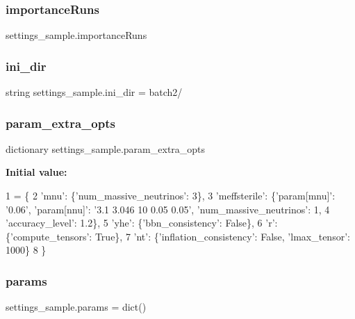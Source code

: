 \mbox{\label{namespacesettings__sample_a9dec1bce772cf771227b345b1956000e}} 
\subsubsection{\texorpdfstring{importance\+Runs}{importanceRuns}}
{\footnotesize\ttfamily settings\+\_\+sample.\+importance\+Runs}

\mbox{\label{namespacesettings__sample_adb7dec45357e0e55ad364e55b495ffd1}} 
\subsubsection{\texorpdfstring{ini\+\_\+dir}{ini\_dir}}
{\footnotesize\ttfamily string settings\+\_\+sample.\+ini\+\_\+dir = \textquotesingle{}batch2/\textquotesingle{}}

\mbox{\label{namespacesettings__sample_a94a24cc6e85354d9fd495fdb6b108266}} 
\subsubsection{\texorpdfstring{param\+\_\+extra\+\_\+opts}{param\_extra\_opts}}
{\footnotesize\ttfamily dictionary settings\+\_\+sample.\+param\+\_\+extra\+\_\+opts}

{\bfseries Initial value\+:}
\begin{DoxyCode}
1 =  \{
2     \textcolor{stringliteral}{'mnu'}: \{\textcolor{stringliteral}{'num\_massive\_neutrinos'}: 3\},
3     \textcolor{stringliteral}{'meffsterile'}: \{\textcolor{stringliteral}{'param[mnu]'}: \textcolor{stringliteral}{'0.06'}, \textcolor{stringliteral}{'param[nnu]'}: \textcolor{stringliteral}{'3.1 3.046 10 0.05 0.05'}, \textcolor{stringliteral}{'num\_massive\_neutrinos'}: 
      1,
4                     \textcolor{stringliteral}{'accuracy\_level'}: 1.2\},
5     \textcolor{stringliteral}{'yhe'}: \{\textcolor{stringliteral}{'bbn\_consistency'}: \textcolor{keyword}{False}\},
6     \textcolor{stringliteral}{'r': \{'}compute\_tensors': True\},
7     \textcolor{stringliteral}{'nt'}: \{\textcolor{stringliteral}{'inflation\_consistency'}: \textcolor{keyword}{False}, \textcolor{stringliteral}{'lmax\_tensor'}: 1000\}
8 \}
\end{DoxyCode}
\mbox{\label{namespacesettings__sample_a143bcab3ee5a8abc7748522a6f416acc}} 
\subsubsection{\texorpdfstring{params}{params}}
{\footnotesize\ttfamily settings\+\_\+sample.\+params = dict()}

